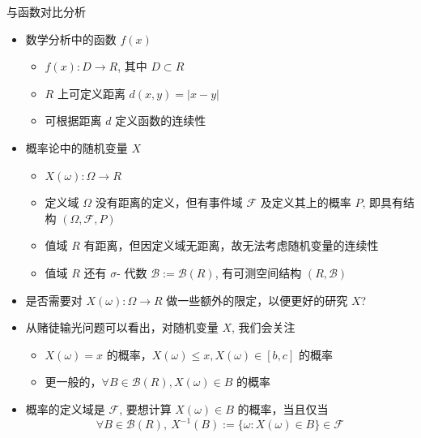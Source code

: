 \documentclass[Prob-All.tex]{subfiles}
\begin{document}
\begin{frame}{与函数对比分析}
	\begin{itemize}[<+-|alert@+>]
		\item 数学分析中的函数 $f (x)$
		      \begin{itemize}[<+-|alert@+>]
			      \item $f (x):D\rightarrow R$, 其中 $D\subset R$
			      \item $R$ 上可定义距离 $d (x,y)=|x-y|$
			      \item 可根据距离 $d$ 定义函数的连续性 %
		      \end{itemize}
		\item 概率论中的随机变量 $X$
		      \begin{itemize}[<+-|alert@+>]
			      \item $X(\omega):\Omega\rightarrow R$
			      \item 定义域 $\Omega$ 没有距离的定义，\pause 但有事件域 $\mathcal{F}$ 及定义其上的概率 $P$, 即具有结构 $(\Omega, \mathcal{F}, P)$\pause
			      \item 值域 $R$ 有距离，\pause 但因定义域无距离，故无法考虑随机变量的连续性 \pause
			      \item 值域 $R$ 还有 $\sigma$- 代数 $\mathcal{B}:=\mathcal{B}(R)$, 有可测空间结构 $(R,\mathcal{B})$
		      \end{itemize}
		\item 是否需要对 $X (\omega):\Omega\rightarrow R$ 做一些额外的限定，以便更好的研究 $X$?
		\item 从赌徒输光问题可以看出，对随机变量 $X$, 我们会关注
		      \begin{itemize}[<+-|alert@+>]
			      \item $X (\omega)=x$ 的概率，\pause $X (\omega)\leq x, X (\omega)\in [b,c]$ 的概率 \pause
			      \item 更一般的，$\forall B\in\mathcal{B}(R), X (\omega)\in B$ 的概率
		      \end{itemize}
		\item 概率的定义域是 $\mathcal{F}$, 要想计算 $X (\omega)\in B$ 的概率，当且仅当
		      \[\forall B\in\mathcal{B}(R), \ X^{-1}(B):=\{\omega: X(\omega)\in B\}\in\mathcal{F}\]
	\end{itemize}
\end{frame}
\end{document}
